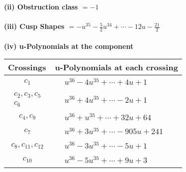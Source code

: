 \documentclass[1p]{elsarticle_modified}
\theoremstyle{definition}
\begin{document}
\flushleft \textbf{(ii) Obstruction class $= -1$}\\~\\
\flushleft \textbf{(iii) Cusp Shapes $= - u^{35}-\frac{5}{2} u^{34}+\cdots-12 u-\frac{21}{2}$}\\~\\
\newpage\renewcommand{\arraystretch}{1}
\flushleft \textbf{(iv) u-Polynomials at the component}\newline \\
\begin{tabular}{m{50pt}|m{274pt}}
Crossings & \hspace{64pt}u-Polynomials at each crossing \\
\hline $$\begin{aligned}c_{1}\end{aligned}$$&$\begin{aligned}
&u^{36}-4 u^{35}+\cdots+4 u+1
\end{aligned}$\\
\hline $$\begin{aligned}c_{2},c_{3},c_{5}\\c_{6}\end{aligned}$$&$\begin{aligned}
&u^{36}+4 u^{35}+\cdots-2 u+1
\end{aligned}$\\
\hline $$\begin{aligned}c_{4},c_{9}\end{aligned}$$&$\begin{aligned}
&u^{36}+u^{35}+\cdots+32 u+64
\end{aligned}$\\
\hline $$\begin{aligned}c_{7}\end{aligned}$$&$\begin{aligned}
&u^{36}+3 u^{35}+\cdots-905 u+241
\end{aligned}$\\
\hline $$\begin{aligned}c_{8},c_{11},c_{12}\end{aligned}$$&$\begin{aligned}
&u^{36}-3 u^{35}+\cdots-5 u+1
\end{aligned}$\\
\hline $$\begin{aligned}c_{10}\end{aligned}$$&$\begin{aligned}
&u^{36}-5 u^{35}+\cdots+9 u+3
\end{aligned}$\\
\hline
\end{tabular}\\~\\
\end{document}
